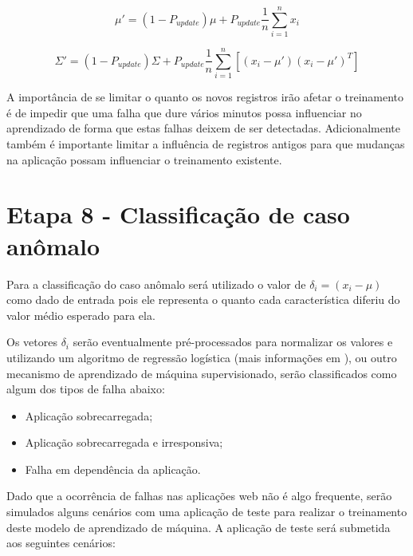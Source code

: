 \begingroup
\Large
\begin{equation}
\displaystyle \mu ' = (1 - P_{update} ) \mu + P_{update} \frac{1}{n} \sum_{i=1}^{n} x_i
\end{equation}
\endgroup

\begingroup
\Large
\begin{equation}
\displaystyle \Sigma ' = (1 - P_{update} ) \Sigma + P_{update} \frac{1}{n} \sum_{i=1}^{n} \left[ ( x_i - \mu ' ) ( x_i - \mu ' )^{T} \right]
\end{equation}
\endgroup

A importância de se limitar o quanto os novos registros irão afetar o treinamento
é de impedir que uma falha que dure vários minutos possa influenciar no
aprendizado de forma que estas falhas deixem de ser detectadas. Adicionalmente
também é importante limitar a influência de registros antigos para que mudanças
na aplicação possam influenciar o treinamento existente.

\section{Etapa 8 - Classificação de caso anômalo}
\label{sec:etapa-8}

Para a classificação do caso anômalo será utilizado o valor de $\delta_i = ( x_i - \mu )$
como dado de entrada pois ele representa o quanto cada característica diferiu do valor
médio esperado para ela.

Os vetores $\delta_i$ serão eventualmente pré-processados para normalizar os valores e
utilizando um algoritmo de regressão logística (mais informações em \citep{mostafa}),
ou outro mecanismo de aprendizado de máquina supervisionado, serão classificados como
algum dos tipos de falha abaixo:

\begin{itemize}
  \item Aplicação sobrecarregada;
  \item Aplicação sobrecarregada e irresponsiva;
  \item Falha em dependência da aplicação.
\end{itemize}

Dado que a ocorrência de falhas nas aplicações web não é algo frequente, serão
simulados alguns cenários com uma aplicação de teste para realizar o treinamento
deste modelo de aprendizado de máquina. A aplicação de teste será submetida aos
seguintes cenários:

